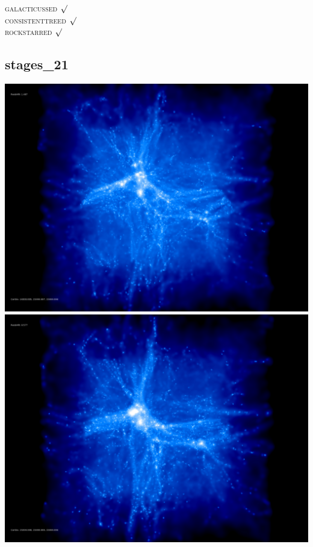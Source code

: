\textsc{galacticussed} $\surd$ \\
\textsc{consistenttreed} $\surd$ \\ 
\textsc{rockstarred} $\surd$

% 
%
%
%
%
%
%
%


\newpage
\subsection{stages\_21}

\includegraphics[scale=0.1]{stages_21/50.jpg} 
\includegraphics[scale=0.1]{stages_21/100.jpg}  \\

